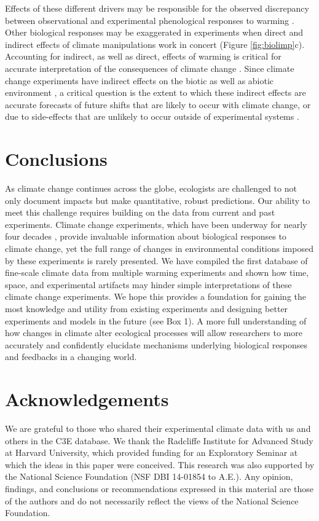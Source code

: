 \documentclass{article}
\begin{document}
Effects of these different drivers may be responsible for the observed discrepancy between observational and experimental phenological responses to warming \citep{wolkovich2012}. Other biological responses may be exaggerated in experiments when direct and indirect effects of climate manipulations work in concert (Figure \ref{fig:biolimp}c). Accounting for indirect, as well as direct, effects of warming is critical for accurate interpretation of the consequences of climate change \citep{kharouba2015}. Since climate change experiments have indirect effects on the biotic as well as abiotic environment \citep{hoeppner2012,pelini2014,diamond2016}, a critical question is the extent to which these indirect effects are accurate forecasts of future shifts that are likely to occur with climate change, or due to side-effects that are unlikely to occur outside of experimental systems \citep{moise2010,diamond2013}.
\section* {Conclusions}
 \par As climate change continues across the globe, ecologists are challenged to not only document impacts but make quantitative, robust predictions. Our ability to meet this challenge requires building on the data from current and past experiments. Climate change experiments, which have been underway for nearly four decades \citep[e.g.,][]{tamaki1981,carlson1982}, provide invaluable information about biological responses to climate change, yet the full range of changes in environmental conditions imposed by these experiments is rarely presented. We have compiled the first database of fine-scale climate data from multiple warming experiments and shown how time, space, and experimental artifacts may hinder simple interpretations of these climate change experiments. We hope this provides a foundation for gaining the most knowledge and utility from existing experiments and designing better experiments and models in the future  (see Box 1). A more full understanding of how changes in climate alter ecological processes will allow researchers to more accurately and confidently elucidate mechanisms underlying biological responses and feedbacks in a changing world.
\section* {Acknowledgements}
We are grateful to those who shared their experimental climate data with us and others in the C3E database. We thank the Radcliffe Institute for Advanced Study at Harvard University, which provided funding for an Exploratory Seminar at which the ideas in this paper were conceived. This research was also supported by the National Science Foundation (NSF DBI 14-01854 to A.E.). Any opinion, findings, and conclusions or recommendations expressed in this material are those of the authors and do not necessarily reflect the views of the National Science Foundation.
\end{document}

